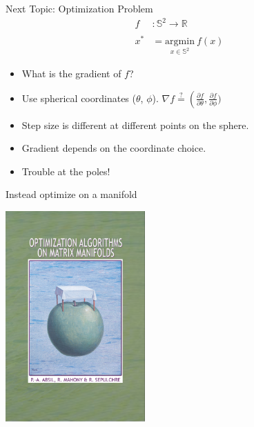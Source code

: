 \documentclass[presentation]{beamer}
\begin{document}
\begin{frame}[label=sec-5]{Next Topic: Optimization Problem}
\begin{align*}
f&: \mathbb{S}^2 \rightarrow \mathbb{R}\\ \\
x^* &= \underset{x\in \mathbb{S}^2}{\mathrm{argmin}}\ f(x)
\end{align*}
\begin{itemize}
\item What is the gradient of $f$?\\
\item Use spherical coordinates ($\theta$, $\phi$). $\nabla f \stackrel{?}{=} \left(\frac{\partial f}{\partial \theta}, \frac{\partial f}{\partial \phi})$
\item Step size is different at different points on the sphere.
\item Gradient depends on the coordinate choice. 
\item Trouble at the poles!
\end{itemize}
\end{frame}
\begin{frame}[label=sec-6]{Instead optimize on a manifold}
\begin{center}
  \includegraphics[width=0.4\textwidth, interpolate=true]{figs/book.png}\\
\end{center}
\end{frame}
\end{document}
